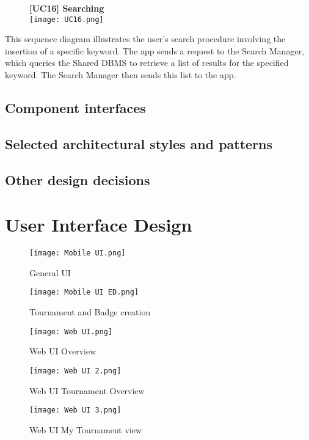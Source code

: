 \documentclass{article}
\begin{document}
\begin{figure}[H]
    \centering
    \textbf{[UC16] Searching} \\
    \texttt{[image: UC16.png]}
\end{figure}
\noindent
This sequence diagram illustrates the user's search procedure involving the insertion of a specific keyword. The app sends a request to the Search Manager, which queries the Shared DBMS to retrieve a list of results for the specified keyword. The Search Manager then sends this list to the app.

\subsection{Component interfaces}

\subsection{Selected architectural styles and patterns}

\subsection{Other design decisions}


\section{User Interface Design}


\begin{figure}[H]
    \centering
    \texttt{[image: Mobile UI.png]}
    \caption{General UI}
\end{figure}

\begin{figure}[H]
    \centering
    \texttt{[image: Mobile UI ED.png]}
    \caption{Tournament and Badge creation}
\end{figure}

\begin{figure}[H]
    \centering
    \texttt{[image: Web UI.png]}
    \caption{Web UI Overview}
\end{figure}

\begin{figure}[H]
    \centering
    \texttt{[image: Web UI 2.png]}
    \caption{Web UI Tournament Overview}
\end{figure}

\begin{figure}[H]
    \centering
    \texttt{[image: Web UI 3.png]}
    \caption{Web UI My Tournament view}
\end{figure}
\end{document}
